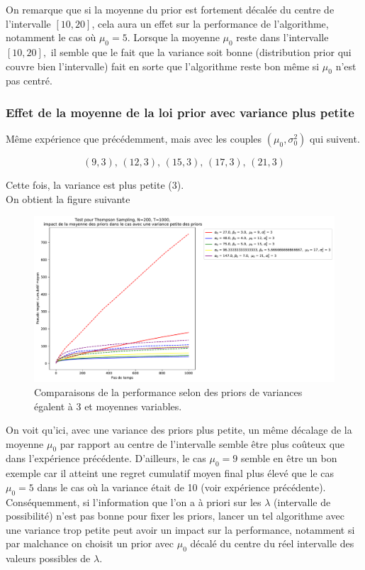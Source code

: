 \documentclass[letterpaper,11pt]{article}
\begin{document}
On remarque que si la moyenne du prior est fortement décalée du centre de l'intervalle $[10,20]$, cela aura un effet sur la performance de l'algorithme, notamment le cas où $\mu_0=5.$ Lorsque la moyenne $\mu_0$ reste dans l'intervalle $[10,20],$ il semble que le fait que la variance soit bonne (distribution prior qui couvre bien l'intervalle) fait en sorte que l'algorithme reste bon même si $\mu_0$ n'est pas centré.   

\subsubsection{Effet de la moyenne de la loi prior avec variance plus petite}

Même expérience que précédemment, mais avec les couples $(\mu_0,\sigma^2_0)$ qui suivent.

$$(9,3),\,(12,3),\,(15,3),\,(17,3),\,(21,3)$$

Cette fois, la variance est plus petite (3).\\

On obtient la figure suivante

\begin{figure}[H]
\label{figure: moyenne décalée 1}
\caption{Comparaisons de la performance selon des priors de variances égalent à 3 et moyennes variables.}
\begin{center}
\includegraphics[scale=0.5]{moyenne_decentree_variance_petite_N=200.pdf}
\end{center}
\end{figure}

On voit qu'ici, avec une variance des priors plus petite, un même décalage de la moyenne $\mu_0$ par rapport au centre de l'intervalle semble être plus coûteux que dans l'expérience précédente. D'ailleurs, le cas $\mu_0=9$ semble en être un bon exemple car il atteint une regret cumulatif moyen final plus élevé que le cas $\mu_0=5$ dans le cas où la variance était de 10 (voir expérience précédente). Conséquemment, si l'information que l'on a à priori sur les $\lambda$ (intervalle de possibilité) n'est pas bonne pour fixer les priors, lancer un tel algorithme avec une variance trop petite peut avoir un impact sur la performance, notamment si par malchance on choisit un prior avec $\mu_0$ décalé du centre du réel intervalle des valeurs possibles de $\lambda.$\\
\end{document}
